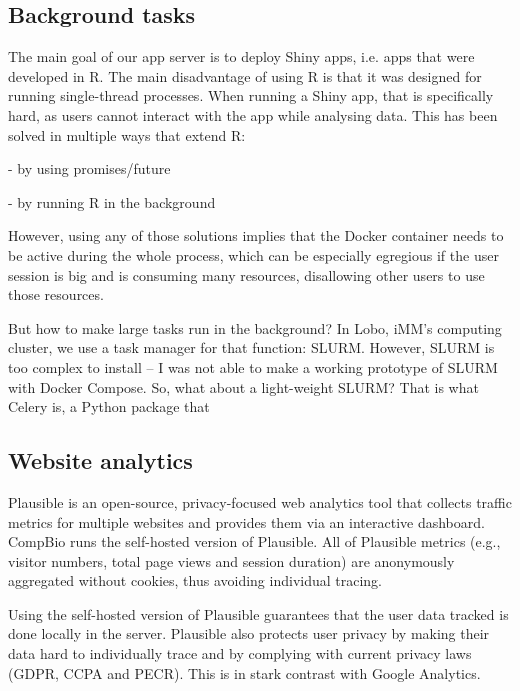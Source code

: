 \subsection{Background tasks}

The main goal of our app server is to deploy Shiny apps, i.e. apps that were developed in R. The main disadvantage of using R is that it was designed for running single-thread processes. When running a Shiny app, that is specifically hard, as users cannot interact with the app while analysing data. This has been solved in multiple ways that extend R:

- by using promises/future

- by running R in the background

However, using any of those solutions implies that the Docker container needs to be active during the whole process, which can be especially egregious if the user session is big and is consuming many resources, disallowing other users to  use those resources.

But how to make large tasks run in the background? In Lobo, iMM's computing cluster, we use a task manager for that function: SLURM. However, SLURM is too complex to install -- I was not able to make a working prototype of SLURM with Docker Compose. So, what about a light-weight SLURM? That is what Celery is, a Python package that 


\subsection{Website analytics}

Plausible is an open-source, privacy-focused web analytics tool that collects traffic metrics for multiple websites and provides them via an interactive dashboard. CompBio runs the self-hosted version of Plausible. All of Plausible metrics (e.g., visitor numbers, total page views and session duration) are anonymously aggregated without cookies, thus avoiding individual tracing.


Using the self-hosted version of Plausible guarantees that the user data tracked is done locally in the server. Plausible also protects user privacy by making their data hard to individually trace and by complying with current privacy laws (GDPR, CCPA and PECR). This is in stark contrast with Google Analytics.

